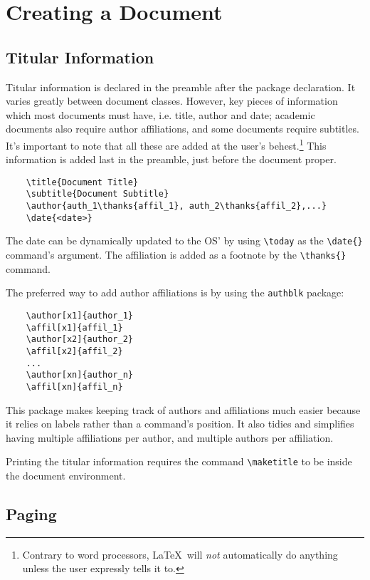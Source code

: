 \chapter{Creating a Document}
\section{Titular Information}
%

Titular information is declared in the preamble after the package
declaration.  It varies greatly between document classes.  However,
key pieces of information which most documents must have, i.e. title,
author and date; academic documents also require author affiliations,
and some documents require subtitles.  It's important to note that all
these are added at the user's behest.\footnote{Contrary to word
  processors, \LaTeX~will \emph{not} automatically do anything unless
  the user expressly tells it to.} This information is added last in
the preamble, just before the document proper.
\begin{verbatim}
	\title{Document Title}
	\subtitle{Document Subtitle}
	\author{auth_1\thanks{affil_1}, auth_2\thanks{affil_2},...}
	\date{<date>}
\end{verbatim}
The date can be dynamically updated to the OS' by using \verb|\today|
as the \verb|\date{}| command's argument.  The affiliation is added as
a footnote by the \verb|\thanks{}| command.

The preferred way to add author affiliations is by using the
\verb|authblk| package:
\begin{verbatim}
	\author[x1]{author_1}
	\affil[x1]{affil_1}
	\author[x2]{author_2}
	\affil[x2]{affil_2}
	...
	\author[xn]{author_n}
	\affil[xn]{affil_n}
\end{verbatim}
This package makes keeping track of authors and affiliations much
easier because it relies on labels rather than a command's position.
It also tidies and simplifies having multiple affiliations per author,
and multiple authors per affiliation.

Printing the titular information requires the command
\verb|\maketitle| to be inside the document environment.

%
\section{Paging}
%


